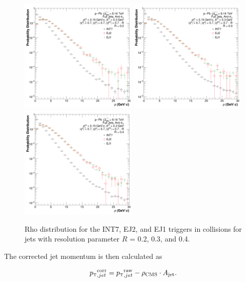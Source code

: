 \begin{figure}[hbt!]
  \centering
  \includegraphics[width=0.49\textwidth]{figures/pPbFigures/BGSubtraction/plotRho_R02.png}
  \includegraphics[width=0.49\textwidth]{figures/pPbFigures/BGSubtraction/plotRho_R03.png}
  \includegraphics[width=0.49\textwidth]{figures/pPbFigures/BGSubtraction/plotRho_R04.png}
  \caption{Rho distribution for the INT7, EJ2, and EJ1 triggers in \pPb collisions for jets with resolution parameter $R$ = 0.2, 0.3, and 0.4.}
  \label{fig:Rho_distribution}
\end{figure}

The corrected jet momentum is then calculated as 

\begin{equation}
    \text{$p_{\mbox{\tiny T}}$}_{,jet}^{\text{corr}} = \text{$p_{\mbox{\tiny T}}$}_{,jet}^{\text{raw}} - \rho_{\text{CMS}} \cdot A_{\text{jet}}.
\end{equation}

